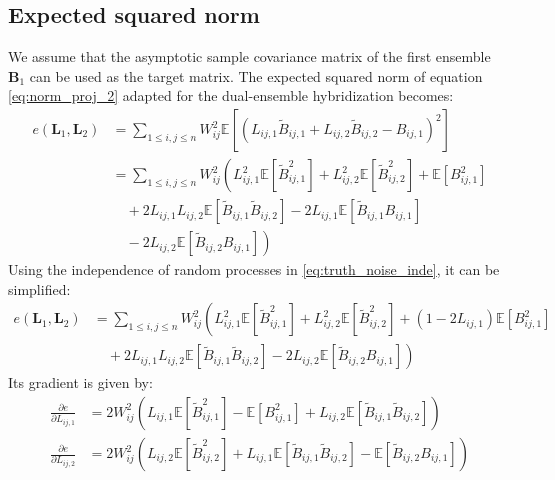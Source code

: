\documentclass[12pt]{scrartcl}
\begin{document}
\subsection{Expected squared norm}
We assume that the asymptotic sample covariance matrix of the first ensemble $\mathbf{B}_1$ can be used as the target matrix. The expected squared norm of equation \eqref{eq:norm_proj_2} adapted for the dual-ensemble hybridization becomes:
\begin{align}
e(\mathbf{L}_1,\mathbf{L}_2) & = \sum_{1 \le i,j \le n} W_{ij}^2 \mathbb{E}\left[ \left(L_{ij,1} \widetilde{B}_{ij,1} + L_{ij,2} \widetilde{B}_{ij,2} - B_{ij,1} \right)^2 \right] \nonumber \\
& = \sum_{1 \le i,j \le n} W_{ij}^2 \left(L_{ij,1}^2 \mathbb{E}\left[\widetilde{B}_{ij,1}^2\right] + L_{ij,2}^2 \mathbb{E}\left[\widetilde{B}_{ij,2}^2\right] + \mathbb{E} \left[B^2_{ij,1}\right] \right. \nonumber \\
& \quad + 2 L_{ij,1} L_{ij,2} \mathbb{E} \left[\widetilde{B}_{ij,1} \widetilde{B}_{ij,2}\right] - 2 L_{ij,1} \mathbb{E} \left[\widetilde{B}_{ij,1} B_{ij,1}\right] \nonumber \\
& \left. \quad - 2 L_{ij,2} \mathbb{E} \left[\widetilde{B}_{ij,2} B_{ij,1}\right]\right)
\end{align}
Using the independence of random processes in \eqref{eq:truth_noise_inde}, it can be simplified:
\begin{align}
e(\mathbf{L}_1,\mathbf{L}_2) & = \sum_{1 \le i,j \le n} W_{ij}^2 \left(L_{ij,1}^2 \mathbb{E}\left[\widetilde{B}_{ij,1}^2\right] + L_{ij,2}^2 \mathbb{E}\left[\widetilde{B}_{ij,2}^2\right] + \left(1 - 2 L_{ij,1}\right) \mathbb{E} \left[B^2_{ij,1}\right] \right. \nonumber \\
& \left. \quad + 2 L_{ij,1} L_{ij,2} \mathbb{E} \left[\widetilde{B}_{ij,1} \widetilde{B}_{ij,2}\right] - 2 L_{ij,2} \mathbb{E} \left[\widetilde{B}_{ij,2} B_{ij,1}\right]\right)
\end{align}
Its gradient is given by:
\begin{subequations}
\begin{align}
\frac{\partial e}{\partial L_{ij,1}} & = 2 W_{ij}^2 \left(L_{ij,1} \mathbb{E}\left[\widetilde{B}_{ij,1}^2\right] - \mathbb{E} \left[B^2_{ij,1}\right] + L_{ij,2} \mathbb{E} \left[\widetilde{B}_{ij,1} \widetilde{B}_{ij,2}\right] \right)\\
\frac{\partial e}{\partial L_{ij,2}} & = 2 W_{ij}^2 \left(L_{ij,2} \mathbb{E}\left[\widetilde{B}_{ij,2}^2\right] + L_{ij,1} \mathbb{E} \left[\widetilde{B}_{ij,1} \widetilde{B}_{ij,2}\right] - \mathbb{E} \left[\widetilde{B}_{ij,2} B_{ij,1}\right] \right)
\end{align}
\end{subequations}
\end{document}
